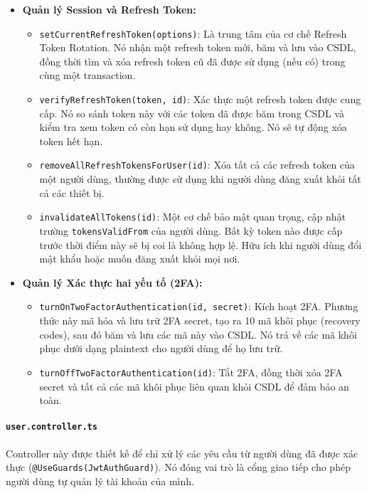 \begin{itemize}
    \item \textbf{Quản lý Session và Refresh Token:}
    \begin{itemize}
        \item \texttt{setCurrentRefreshToken(options)}: Là trung tâm của cơ chế Refresh Token Rotation. Nó nhận một refresh token mới, băm và lưu vào CSDL, đồng thời tìm và xóa refresh token cũ đã được sử dụng (nếu có) trong cùng một transaction.
        \item \texttt{verifyRefreshToken(token, id)}: Xác thực một refresh token được cung cấp. Nó so sánh token này với các token đã được băm trong CSDL và kiểm tra xem token có còn hạn sử dụng hay không. Nó sẽ tự động xóa token hết hạn.
        \item \texttt{removeAllRefreshTokensForUser(id)}: Xóa tất cả các refresh token của một người dùng, thường được sử dụng khi người dùng đăng xuất khỏi tất cả các thiết bị.
        \item \texttt{invalidateAllTokens(id)}: Một cơ chế bảo mật quan trọng, cập nhật trường \texttt{tokensValidFrom} của người dùng. Bất kỳ token nào được cấp trước thời điểm này sẽ bị coi là không hợp lệ. Hữu ích khi người dùng đổi mật khẩu hoặc muốn đăng xuất khỏi mọi nơi.
    \end{itemize}
    
    \item \textbf{Quản lý Xác thực hai yếu tố (2FA):}
    \begin{itemize}
        \item \texttt{turnOnTwoFactorAuthentication(id, secret)}: Kích hoạt 2FA. Phương thức này mã hóa và lưu trữ 2FA secret, tạo ra 10 mã khôi phục (recovery codes), sau đó băm và lưu các mã này vào CSDL. Nó trả về các mã khôi phục dưới dạng plaintext cho người dùng để họ lưu trữ.
        \item \texttt{turnOffTwoFactorAuthentication(id)}: Tắt 2FA, đồng thời xóa 2FA secret và tất cả các mã khôi phục liên quan khỏi CSDL để đảm bảo an toàn.
    \end{itemize}
\end{itemize}

\paragraph{\texttt{user.controller.ts}}
Controller này được thiết kế để chỉ xử lý các yêu cầu từ người dùng đã được xác thực (\texttt{@UseGuards(JwtAuthGuard)}). Nó đóng vai trò là cổng giao tiếp cho phép người dùng tự quản lý tài khoản của mình.

